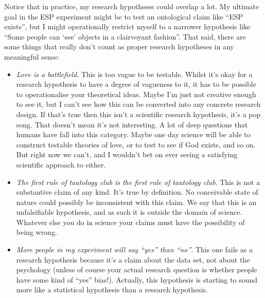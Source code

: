 \documentclass[
  a4paper,
]{book}
\providecommand{\tightlist}{%
  \setlength{\itemsep}{0pt}\setlength{\parskip}{0pt}}
\begin{document}
Notice that in practice, my research hypotheses could overlap a lot. My
ultimate goal in the ESP experiment might be to test an ontological
claim like ``ESP exists'', but I might operationally restrict myself to
a narrower hypothesis like ``Some people can `see' objects in a
clairvoyant fashion''. That said, there are some things that really
don't count as proper research hypotheses in any meaningful sense:

\begin{itemize}
\tightlist
\item
  \emph{Love is a battlefield}. This is too vague to be testable. Whilst
  it's okay for a research hypothesis to have a degree of vagueness to
  it, it has to be possible to operationalise your theoretical ideas.
  Maybe I'm just not creative enough to see it, but I can't see how this
  can be converted into any concrete research design. If that's true
  then this isn't a scientific research hypothesis, it's a pop song.
  That doesn't mean it's not interesting. A lot of deep questions that
  humans have fall into this category. Maybe one day science will be
  able to construct testable theories of love, or to test to see if God
  exists, and so on. But right now we can't, and I wouldn't bet on ever
  seeing a satisfying scientific approach to either.
\item
  \emph{The first rule of tautology club is the first rule of tautology
  club}. This is not a substantive claim of any kind. It's true by
  definition. No conceivable state of nature could possibly be
  inconsistent with this claim. We say that this is an unfalsifiable
  hypothesis, and as such it is outside the domain of science. Whatever
  else you do in science your claims must have the possibility of being
  wrong.
\item
  \emph{More people in my experiment will say ``yes'' than ``no''}. This
  one fails as a research hypothesis because it's a claim about the data
  set, not about the psychology (unless of course your actual research
  question is whether people have some kind of ``yes'' bias!). Actually,
  this hypothesis is starting to sound more like a statistical
  hypothesis than a research hypothesis.
\end{itemize}
\end{document}
